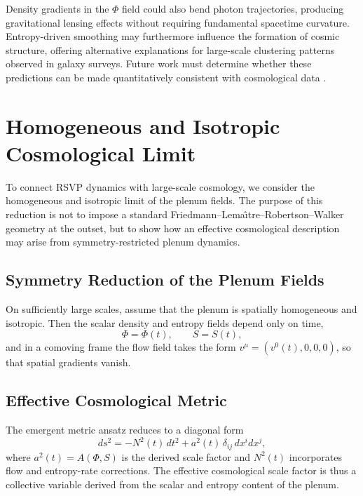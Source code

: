 \documentclass[12pt,a4paper]{article}
\theoremstyle{plain}
\theoremstyle{definition}
\theoremstyle{remark}
\begin{document}
Density gradients in the $\Phi$ field could also bend photon
trajectories, producing gravitational lensing effects without requiring
fundamental spacetime curvature. Entropy-driven smoothing may
furthermore influence the formation of cosmic structure, offering
alternative explanations for large-scale clustering patterns observed
in galaxy surveys. Future work must determine whether these predictions
can be made quantitatively consistent with cosmological data
\cite{Carroll2019,MisnerThorneWheeler,Penrose}.

\section{Homogeneous and Isotropic Cosmological Limit}
\label{sec:cosmo}

To connect RSVP dynamics with large-scale cosmology, we consider the
homogeneous and isotropic limit of the plenum fields. The purpose of
this reduction is not to impose a standard Friedmann--Lema\^{\i}tre--Robertson--Walker
geometry at the outset, but to show how an effective cosmological
description may arise from symmetry-restricted plenum dynamics.

\subsection{Symmetry Reduction of the Plenum Fields}

On sufficiently large scales, assume that the plenum is spatially
homogeneous and isotropic. Then the scalar density and entropy fields
depend only on time,
\begin{equation}
\Phi = \Phi(t), \qquad S = S(t),
\end{equation}
and in a comoving frame the flow field takes the form $v^\mu =
(v^0(t),0,0,0)$, so that spatial gradients vanish.

\subsection{Effective Cosmological Metric}

The emergent metric ansatz reduces to a diagonal form
\begin{equation}
ds^2 = -N^2(t)\,dt^2 + a^2(t)\,\delta_{ij}\,dx^i dx^j,
\end{equation}
where $a^2(t) = A(\Phi,S)$ is the derived scale factor and $N^2(t)$
incorporates flow and entropy-rate corrections. The effective
cosmological scale factor is thus a collective variable derived from
the scalar and entropy content of the plenum.
\end{document}
